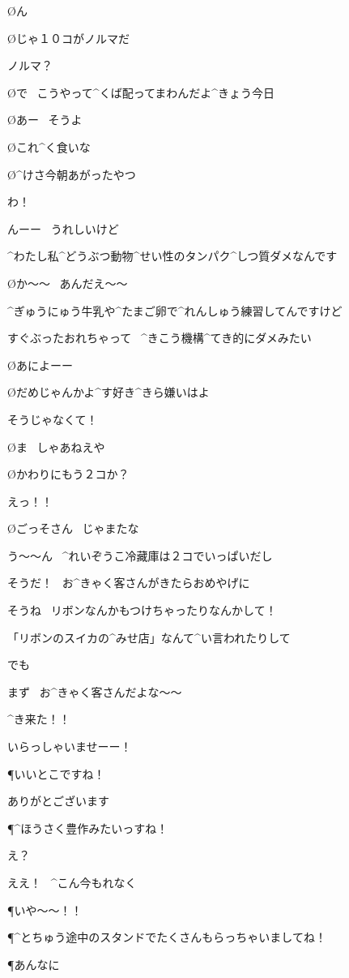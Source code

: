 \page
\O ん

\O じゃ１０コがノルマだ

\A ノルマ？

\O で
\ こうやって^{くば}{配}ってまわんだよ^{きょう}{今日}

\O あー
\ そうよ

\page
\O これ^{く}{食}いな

\O ^{けさ}{今朝}あがったやつ

\A わ！

\A んーー
\ うれしいけど

\A ^{わたし}{私}^{どうぶつ}{動物}^{せい}{性}のタンパク^{しつ}{質}ダメなんです

\O か〜〜
\ あんだえ〜〜

\A ^{ぎゅうにゅう}{牛乳}や^{たまご}{卵}で^{れんしゅう}{練習}してんですけど

\A すぐぶったおれちゃって
\ ^{きこう}{機構}^{てき}{的}にダメみたい

\page
\O あによーー

\O だめじゃんかよ^{す}{好}き^{きら}{嫌}いはよ

\A そうじゃなくて！

\O ま
\ しゃあねえや

\O かわりにもう２コか？

\A えっ！！

\O ごっそさん
\ じゃまたな

\page
\A う〜〜ん
\ ^{れいぞうこ}{冷藏庫}は２コでいっぱいだし

\page
\A そうだ！
\ お^{きゃく}{客}さんがきたらおめやげに

\A そうね
\ リボンなんかもつけちゃったりなんかして！

\A 「リボンのスイカの^{みせ}{店}」なんて^{い}{言}われたりして

\A でも

\A まず
\ お^{きゃく}{客}さんだよな〜〜

\A ^{き}{来}た！！

\page
\A いらっしゃいませーー！

\page
\P いいとこですね！

\A ありがとございます

\P ^{ほうさく}{豊作}みたいっすね！

\A え？

\A ええ！
\ ^{こん}{今}もれなく

\P いや〜〜！！

\P ^{とちゅう}{途中}のスタンドでたくさんもらっちゃいましてね！

\P あんなに

